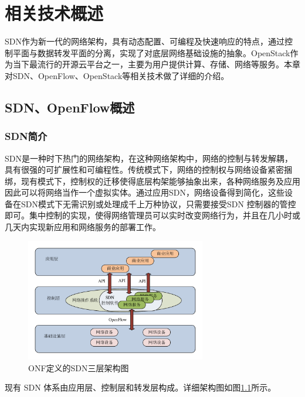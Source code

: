 
\chapter{相关技术概述}
SDN作为新一代的网络架构，具有动态配置、可编程及快速响应的特点，通过控制平面与数据转发平面的分离，实现了对底层网络基础设施的抽象。OpenStack作为当下最流行的开源云平台之一，主要为用户提供计算、存储、网络等服务。本章对SDN、OpenFlow、OpenStack等相关技术做了详细的介绍。
\section{SDN、OpenFlow概述}
\subsection{SDN简介}
SDN是一种时下热门的网络架构，在这种网络架构中，网络的控制与转发解耦，具有很强的可扩展性和可编程性。传统模式下，网络的控制权与网络设备紧密捆绑，现有模式下，控制权的迁移使得底层构架能够抽象出来，各种网络服务及应用因此可以将网络当作一个虚拟实体。通过应用SDN，网络设备得到简化，这些设备在SDN模式下无需识别或处理成千上万种协议，只需要接受SDN 控制器的管控即可。集中控制的实现，使得网络管理员可以实时改变网络行为，并且在几小时或几天内实现新应用和网络服务的部署工作\cite{SDN-3}。

\begin{figure}[!htb]
  \centering
  \includegraphics[width=0.7\textwidth]{logo/sdn}
  \caption{ONF定义的SDN三层架构图}
  \label{fig:sdn}
\end{figure}

现有 SDN 体系由应用层、控制层和转发层构成。详细架构图如图\ref{fig:sdn}所示\cite{SDN-2}。

